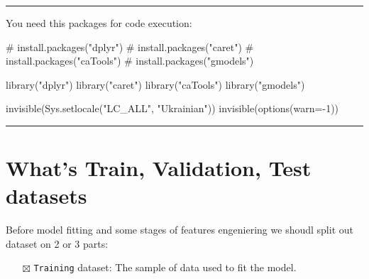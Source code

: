 \documentclass[
  letterpaper,
  DIV=11,
  numbers=noendperiod]{scrreprt}
\newenvironment{Shaded}{\begin{snugshade}}{\end{snugshade}}
\newcommand{\AttributeTok}[1]{\textcolor[rgb]{0.40,0.45,0.13}{#1}}
\newcommand{\CommentTok}[1]{\textcolor[rgb]{0.37,0.37,0.37}{#1}}
\newcommand{\DecValTok}[1]{\textcolor[rgb]{0.68,0.00,0.00}{#1}}
\newcommand{\FunctionTok}[1]{\textcolor[rgb]{0.28,0.35,0.67}{#1}}
\newcommand{\NormalTok}[1]{\textcolor[rgb]{0.00,0.23,0.31}{#1}}
\newcommand{\SpecialCharTok}[1]{\textcolor[rgb]{0.37,0.37,0.37}{#1}}
\newcommand{\StringTok}[1]{\textcolor[rgb]{0.13,0.47,0.30}{#1}}
\providecommand{\tightlist}{%
  \setlength{\itemsep}{0pt}\setlength{\parskip}{0pt}}\usepackage{longtable,booktabs,array}
\begin{document}
\begin{center}\rule{0.5\linewidth}{0.5pt}\end{center}

You need this packages for code execution:

\begin{Shaded}
\begin{Highlighting}[]
\CommentTok{\# install.packages("dplyr")}
\CommentTok{\# install.packages("caret")}
\CommentTok{\# install.packages("caTools")}
\CommentTok{\# install.packages("gmodels")}
\end{Highlighting}
\end{Shaded}

\begin{Shaded}
\begin{Highlighting}[]
\FunctionTok{library}\NormalTok{(}\StringTok{"dplyr"}\NormalTok{)}
\FunctionTok{library}\NormalTok{(}\StringTok{"caret"}\NormalTok{)}
\FunctionTok{library}\NormalTok{(}\StringTok{"caTools"}\NormalTok{)}
\FunctionTok{library}\NormalTok{(}\StringTok{"gmodels"}\NormalTok{)}
\end{Highlighting}
\end{Shaded}

\begin{Shaded}
\begin{Highlighting}[]
\FunctionTok{invisible}\NormalTok{(}\FunctionTok{Sys.setlocale}\NormalTok{(}\StringTok{"LC\_ALL"}\NormalTok{, }\StringTok{"Ukrainian"}\NormalTok{))}
\FunctionTok{invisible}\NormalTok{(}\FunctionTok{options}\NormalTok{(}\AttributeTok{warn=}\SpecialCharTok{{-}}\DecValTok{1}\NormalTok{))}
\end{Highlighting}
\end{Shaded}

\begin{center}\rule{0.5\linewidth}{0.5pt}\end{center}

\section{What's Train, Validation, Test
datasets}\label{whats-train-validation-test-datasets}

Before model fitting and some stages of features engeniering we shoudl
split out dataset on 2 or 3 parts:

\begin{itemize}
\tightlist
\item[$\boxtimes$]
  \texttt{Training} dataset: The sample of data used to fit the model.
\end{itemize}
\end{document}
